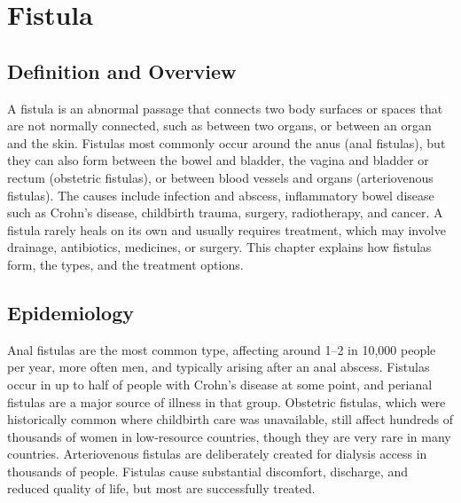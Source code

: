 \chapter{Fistula}

\section*{Definition and Overview}
A fistula is an abnormal passage that connects two body surfaces or spaces that are not normally connected, such as between two organs, or between an organ and the skin. Fistulas most commonly occur around the anus (anal fistulas), but they can also form between the bowel and bladder, the vagina and bladder or rectum (obstetric fistulas), or between blood vessels and organs (arteriovenous fistulas). The causes include infection and abscess, inflammatory bowel disease such as Crohn's disease, childbirth trauma, surgery, radiotherapy, and cancer. A fistula rarely heals on its own and usually requires treatment, which may involve drainage, antibiotics, medicines, or surgery. This chapter explains how fistulas form, the types, and the treatment options.

\section*{Epidemiology}
Anal fistulas are the most common type, affecting around 1--2 in 10,000 people per year, more often men, and typically arising after an anal abscess. Fistulas occur in up to half of people with Crohn's disease at some point, and perianal fistulas are a major source of illness in that group. Obstetric fistulas, which were historically common where childbirth care was unavailable, still affect hundreds of thousands of women in low-resource countries, though they are very rare in many countries. Arteriovenous fistulas are deliberately created for dialysis access in thousands of people. Fistulas cause substantial discomfort, discharge, and reduced quality of life, but most are successfully treated.

